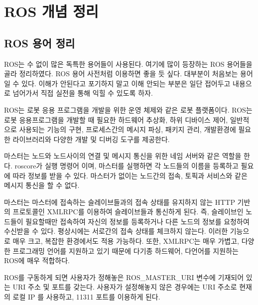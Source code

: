 
\chapter{ROS 개념 정리}

\section{ROS 용어 정리}\label{sec:RosTerm}

ROS는 수 없이 많은 독특한 용어들이 사용된다. 여기에 많이 등장하는 ROS 용어들을 골라 정리하였다. ROS 용어 사전처럼 이용하면 좋을 듯 싶다. 대부분이 처음보는 용어일 수 있다. 이해가 안된다고 포기하지 말고 이해 안되는 부분은 일단 접어두고 내용으로 넘어가서 직접 실전을 통해 익힐 수 있도록 하자.

\vspace{\baselineskip}
\begin{definition}[ROS]\label{def:Ros}
ROS는 로봇 응용 프로그램을 개발을 위한 운영 체제와 같은 로봇 플랫폼이다. ROS는 로봇 응용프로그램을 개발할 때 필요한 하드웨어 추상화, 하위 디바이스 제어, 일반적으로 사용되는 기능의 구현, 프로세스간의 메시지 파싱, 패키지 관리, 개발환경에 필요한 라이브러리와 다양한 개발 및 디버깅 도구를 제공한다.
\end{definition}

\vspace{\baselineskip}
\begin{definition}\label{def:RosMaster}
마스터는 노드와 노드사이의 연결 및 메시지 통신을 위한 네임 서버와 같은 역할을 한다. roscore가 실행 명령어 이며, 마스터를 실행하면 각 노드들의 이름을 등록하고 필요에 따라 정보를 받을 수 있다. 마스터가 없이는 노드간의 접속, 토픽과 서비스와 같은 메시지 통신을 할 수 없다. 

마스터는 마스터에 접속하는 슬레이브들과의 접속 상태를 유지하지 않는 HTTP 기반의 프로토콜인 XMLRPC를 이용하여 슬레이브들과 통신하게 된다. 즉, 슬레이브인 노드들이 필요할때만 접속하여 자신의 정보를 등록하거나 다른 노드의 정보를 요청하여 수신받을 수 있다. 평상시에는 서로간의 접속 상태를 체크하지 않는다. 이러한 기능으로 매우 크고, 복잡한 환경에서도 적용 가능하다. 또한, XMLRPC는 매우 가볍고, 다양한 프로그래밍 언어를 지원하고 있기 때문에 다기종 하드웨어, 다언어를 지원하는 ROS에 매우 적합하다.

ROS를 구동하게 되면 사용자가 정해놓은 ROS\_MASTER\_URI 변수에 기재되어 있는 URI 주소 및 포트를 갖는다. 사용자가 설정해놓지 않은 경우에는 URI 주소로 현재의 로컬 IP 를 사용하고, 11311 포트를 이용하게 된다.
\end{definition}

